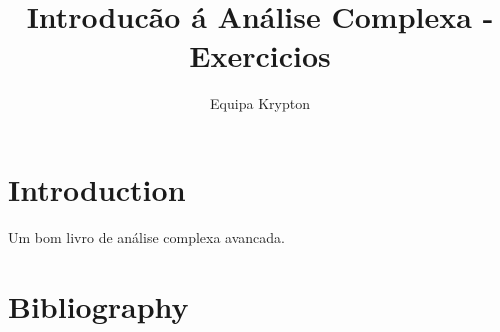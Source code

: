 \documentclass{article}
\title{Introducão á Análise Complexa - Exercicios}
\author{Equipa Krypton}
\begin{document}
\maketitle

\section{Introduction}

Um bom livro de análise complexa avancada.


\newpage
\section*{Bibliography}
\printbibliography
\end{document}
